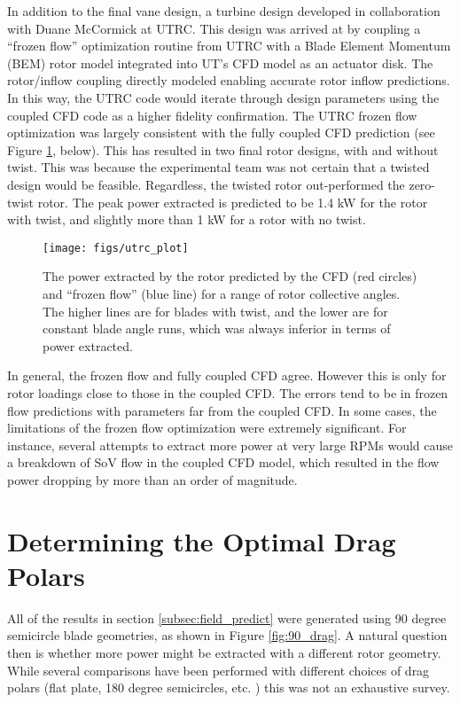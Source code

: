 In addition to the final vane design, a turbine design developed in
collaboration with Duane McCormick at UTRC. This design was arrived at
by coupling a ``frozen flow'' optimization routine from UTRC with a Blade
Element Momentum (BEM) rotor model integrated into UT's CFD model as an
actuator disk. The rotor/inflow coupling directly modeled enabling
accurate rotor inflow predictions. In this way, the UTRC code would
iterate through design parameters using the coupled CFD code as a higher
fidelity confirmation. The UTRC frozen flow optimization was largely
consistent with the fully coupled CFD prediction (see Figure \ref{},
below). This has resulted in two final rotor designs, with and without
twist. This was because the experimental team was not certain that a
twisted design would be feasible. Regardless, the twisted rotor
out-performed the zero-twist rotor. The peak power extracted is
predicted to be 1.4 kW for the rotor with twist, and slightly more than
1 kW for a rotor with no twist. 

  \begin{figure}[!htb]
   \begin{center}
    \texttt{[image: figs/utrc\_plot]}
    \caption{The power extracted by the rotor predicted by the CFD (red
    circles) and ``frozen flow'' (blue line) for a range of rotor
    collective angles. The higher lines are for blades with twist, and
    the lower are for constant blade angle runs, which was always
    inferior in terms of power extracted.}
    \label{fig:UTRC_turbine}
   \end{center}
  \end{figure}


In general, the frozen flow and fully coupled CFD agree. However this is
only for rotor loadings close to those in the coupled CFD. The errors
tend to be in frozen flow predictions with parameters far from the
coupled CFD. In some cases, the limitations of the frozen flow
optimization were extremely significant. For instance, several attempts
to extract more power at very large RPMs would cause a breakdown of SoV
flow in the coupled CFD model, which resulted in the flow power dropping
by more than an order of magnitude. 


\section{Determining the Optimal Drag Polars}

All of the results in section \ref{subsec:field_predict} were generated
using 90 degree semicircle blade geometries, as shown in Figure
\ref{fig:90_drag}. A natural question then is whether more power might
be extracted with a different rotor geometry. While several comparisons
have been performed with different choices of drag polars (flat plate,
180 degree semicircles, etc. ) this was not an exhaustive survey. 

